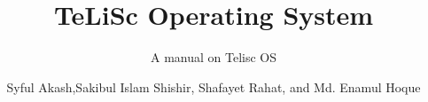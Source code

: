 \documentclass[graybox,envcountchap,sectrefs]{svmono}
\begin{document}
\author{Syful Akash,Sakibul Islam Shishir, Shafayet Rahat,  and Md. Enamul Hoque}
\title{TeLiSc Operating System}
\subtitle{A manual on Telisc OS}
\maketitle

\frontmatter%






\tableofcontents
\mainmatter




\mainmatter%
%









\backmatter%



\printindex

\end{document}
